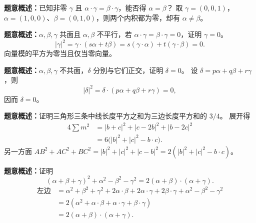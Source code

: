 \textbf{题意概述：}已知非零 $\gamma$ 且 $\alpha\cdot\gamma=\beta\cdot\gamma$，能否得 $\alpha=\beta$？
取 $\gamma=(0,0,1)$，$\alpha=(1,0,0)$、$\beta=(0,1,0)$，则两个内积都为零，却有 $\alpha\neq\beta$。

\textbf{题意概述：}$\alpha,\beta,\gamma$ 共面且 $\alpha,\beta$ 不平行，若 $\alpha\cdot\gamma=\beta\cdot\gamma=0$，证明 $\gamma=0$。
\[
|\gamma|^2=\gamma\cdot(s\alpha+t\beta)
=s(\gamma\cdot\alpha)+t(\gamma\cdot\beta)=0.
\]
向量模的平方为零当且仅当零向量。

\textbf{题意概述：}$\alpha,\beta,\gamma$ 不共面，$\delta$ 分别与它们正交，证明 $\delta=0$。
设 $\delta=p\alpha+q\beta+r\gamma$，则
\[
|\delta|^2=\delta\cdot(p\alpha+q\beta+r\gamma)=0,
\]
因而 $\delta=0$。

\textbf{题意概述：}证明三角形三条中线长度平方之和为三边长度平方和的 $3/4$。
展开得
\begin{align*}
4\sum m^2&=|b+c|^2+|c-2b|^2+|b-2c|^2\\
&=6\bigl(|b|^2+|c|^2-b\cdot c\bigr).
\end{align*}
另一方面 $AB^2+AC^2+BC^2=|b|^2+|c|^2+|c-b|^2
=2(|b|^2+|c|^2-b\cdot c)$。

\textbf{题意概述：}证明
\[
(\alpha+\beta+\gamma)^2+\alpha^2-\beta^2-\gamma^2
=2(\alpha+\beta)\cdot(\alpha+\gamma).
\]
\begin{align*}
\text{左边}&=\alpha^2+\beta^2+\gamma^2
+2\alpha\cdot\beta+2\alpha\cdot\gamma+2\beta\cdot\gamma
+\alpha^2-\beta^2-\gamma^2\\
&=2(\alpha^2+\alpha\cdot\beta+\alpha\cdot\gamma+\beta\cdot\gamma)\\
&=2(\alpha+\beta)\cdot(\alpha+\gamma).
\end{align*}

